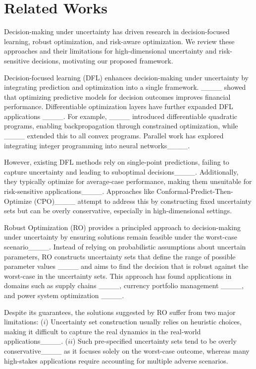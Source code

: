 \section{Related Works}
Decision-making under uncertainty has driven research in decision-focused learning, robust optimization, and risk-aware optimization. We review these approaches and their limitations for high-dimensional uncertainty and risk-sensitive decisions, motivating our proposed framework.

Decision-focused learning (DFL) enhances decision-making under uncertainty by integrating prediction and optimization into a single framework. ____ showed that optimizing predictive models for decision outcomes improves financial performance. 
Differentiable optimization layers have further expanded DFL applications ____. For example, ____ introduced differentiable quadratic programs, enabling backpropagation through constrained optimization, while ____ extended this to all convex programs. Parallel work has explored integrating integer programming into neural networks____.

However, existing DFL methods rely on single-point predictions, failing to capture uncertainty and leading to suboptimal decisions____. Additionally, they typically optimize for average-case performance, making them unsuitable for risk-sensitive applications____. Approaches like Conformal-Predict-Then-Optimize (CPO)____ attempt to address this by constructing fixed uncertainty sets but can be overly conservative, especially in high-dimensional settings.

Robust Optimization (RO) provides a principled approach to decision-making under uncertainty by ensuring solutions remain feasible under the worst-case scenario____. Instead of relying on probabilistic assumptions about uncertain parameters, RO constructs uncertainty sets that define the range of possible parameter values ____ and aims to find the decision that is robust against the worst-case in the uncertainty sets. This approach has found applications in domains such as supply chains ____, currency portfolio management ____, and power system optimization ____. 

Despite its guarantees, the solutions suggested by RO suffer from two major limitations: 
($i$) Uncertainty set construction usually relies on heuristic choices, making it difficult to capture the real dynamics in the real-world applications____.
($ii$) Such pre-specified uncertainty sets tend to be overly conservative____ as it focuses solely on the worst-case outcome, whereas many high-stakes applications require accounting for multiple adverse scenarios.

